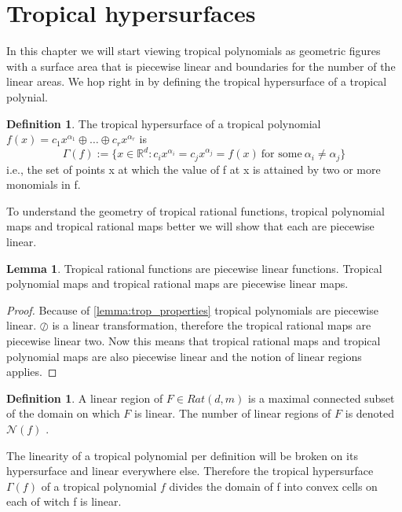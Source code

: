 \documentclass{article}
\theoremstyle{definition}
\newtheorem{lemma}[theorem]{Lemma}
\newtheorem{definition}[theorem]{Definition}
\begin{document}
\section{Tropical hypersurfaces}
\label{sec:tropical_hypersurfaces}

In this chapter we will start viewing tropical polynomials as geometric figures with a surface area that is piecewise linear and boundaries for the number of the linear areas. We hop right in by defining the tropical hypersurface of a tropical polynial. 
 
\begin{definition}\cite[p.~3]{zhang2018tropical}
The tropical hypersurface of a tropical polynomial $f(x) = c_1 x^{\alpha_1} \oplus \dots \oplus c_r x^{\alpha_r}$ is 
$$\Gamma(f) := \{ x \in \mathbb{R}^{d} : c_i x^{\alpha_i} = c_j x^{\alpha_j} = f(x) \ \text{for some} \ \alpha_i \neq \alpha_j \}$$
i.e., the set of points x at which the value of f at x is attained by two or more monomials in f.
\end{definition}

To understand the geometry of tropical rational functions, tropical polynomial maps and tropical rational maps better we will show that each are piecewise linear.


\begin{lemma}
Tropical rational functions are piecewise linear functions. Tropical polynomial maps and tropical rational maps are piecewise linear maps.
\end{lemma}
\begin{proof}
Because of \ref{lemma:trop_properties} tropical polynomials are piecewise linear. $\oslash$ is a linear transformation, therefore the tropical rational maps are piecewise linear two. Now this means that tropical rational maps and tropical polynomial maps are also piecewise linear and the notion of linear regions applies.
\end{proof}

\begin{definition}
A linear region of $F \in Rat(d, m)$ is a maximal connected subset of the domain on which $F$ is linear. The number of linear regions of $F$ is denoted $\mathcal{N}(f)$ \cite[p.~4]{zhang2018tropical}.
\end{definition}

The linearity of a tropical polynomial per definition will be broken on its hypersurface and linear everywhere else. Therefore the tropical hypersurface $\Gamma(f)$ of a tropical polynomial $f$ divides the domain of f into convex cells on each of witch f is linear.
\end{document}
